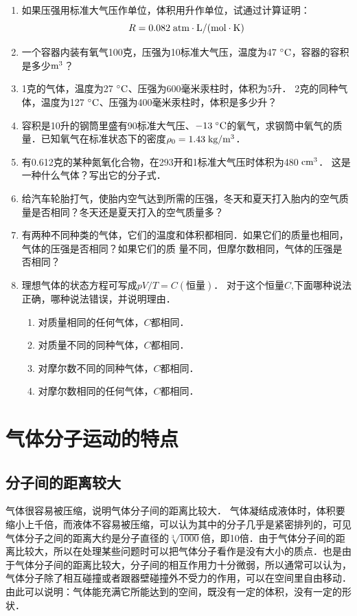 \begin{enumerate}
    \item 如果压强用标准大气压作单位，体积用升作单位，试通过计算证明：$$R=0.082 \;\text{atm}\cdot\text{L}/(\text{mol}\cdot\text{K}) $$
\item 一个容器内装有氧气100克，压强为10标准大气压，温度为47$\;{}^\circ\text{C}$，容器的容积是多少$\text{m}^3$？
\item 1克的气体，温度为27$\;{}^\circ\text{C}$、压强为600毫米汞柱时，体积为5升．
2克的同种气体，温度为127$\;{}^\circ\text{C}$、压强为400毫米汞柱时，体积是多少升？
\item 容积是10升的钢筒里盛有90标准大气压、$-13 \;{}^\circ\text{C} $的氧气，求钢筒中氧气的质量．已知氧气在标准状态下的密度$\rho_0=1.43 \;\text{kg}/\text{m}^3$．
\item 有0.612克的某种氮氧化合物，在293开和1标准大气压时体积为480$\;\text{cm}^3$．
这是一种什么气体？写出它的分子式．
\item 给汽车轮胎打气，使胎内空气达到所需的压强，冬天和夏天打入胎内的空气质量是否相同？冬天还是夏天打入的空气质量多？
\item 有两种不同种类的气体，它们的温度和体积都相同．如果它们的质量也相同，气体的压强是否相同？如果它们的质
量不同，但摩尔数相同，气体的压强是否相同？
\item 理想气体的状态方程可写成$pV/T=C(\text{恒量})$．
对于这个恒量$C$,下面哪种说法正确，哪种说法错误，并说明理由．
\begin{enumerate}
\item 对质量相同的任何气体，$C$都相同．
\item 对质量不同的同种气体，$C$都相同．    
\item 对摩尔数不同的同种气体，$C$都相同．
\item 对摩尔数相同的任何气体，$C$都相同．
\end{enumerate}
\end{enumerate}

\section{气体分子运动的特点}\label{sec-B-3-7-characteristics-of-gas-molecular-motion}
\subsection{分子间的距离较大} 
气体很容易被压缩，说明气体分子间的距离比较大．
气体凝结成液体时，体积要缩小上千倍，而液体不容易被压缩，可以认为其中的分子几乎是紧密排列的，可见气体分子之间的距离大约是分子直径的$\sqrt[3]{1000}$倍，即10倍．由于气体分子间的距离比较大，所以在处理某些问题时可以把气体分子看作是没有大小的质点．也是由于气体分子间的距离比较大，分子间的相互作用力十分微弱，所以通常可以认为，气体分子除了相互碰撞或者跟器壁碰撞外不受力的作用，可以在空间里自由移动．由此可以说明：气体能充满它所能达到的空间，既没有一定的体积，没有一定的形状．

